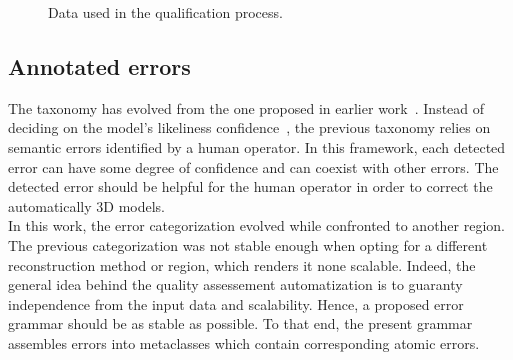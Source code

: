 \documentclass[../main.tex]{subfiles}
\begin{document}
    \begin{figure}[H]
        {
            \caption{\label{fig::dataset} Data used in the qualification process.}
        }
    \end{figure}

    \subsection{Annotated errors}

    The taxonomy has evolved from the one proposed in earlier work~\cite{michelin2013quality}. Instead of deciding on the model's likeliness confidence~\cite{Boudet2006}, the previous taxonomy relies on semantic errors identified by a human operator. In this framework, each detected error can have some degree of confidence and can coexist with other errors. The detected error should be helpful for the human operator in order to correct the automatically 3D models.\\

    In this work, the error categorization evolved while confronted to another region. The previous categorization was not stable enough when opting for a different reconstruction method or region, which renders it none scalable. Indeed, the general idea behind the quality assessement automatization is to guaranty independence from the input data and scalability. Hence, a proposed error grammar should be as stable as possible. To that end, the present grammar assembles errors into metaclasses which contain corresponding atomic errors.\\
\end{document}
